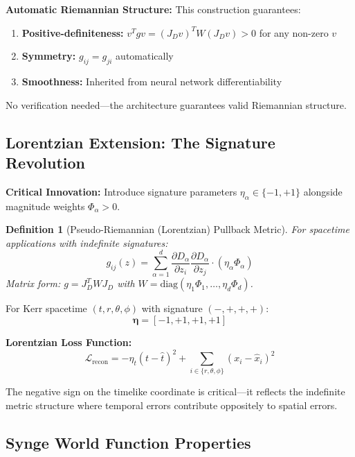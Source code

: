\documentclass[11pt,a4paper]{article}
\newtheorem{definition}{Definition}
\begin{document}
\textbf{Automatic Riemannian Structure:} This construction guarantees:
\begin{enumerate}
\item \textbf{Positive-definiteness:} $v^T g v = (J_D v)^T W (J_D v) > 0$ for any non-zero $v$
\item \textbf{Symmetry:} $g_{ij} = g_{ji}$ automatically
\item \textbf{Smoothness:} Inherited from neural network differentiability
\end{enumerate}

No verification needed—the architecture guarantees valid Riemannian structure.

\subsection{Lorentzian Extension: The Signature Revolution}

\textbf{Critical Innovation:} Introduce signature parameters $\eta_\alpha \in \{-1,+1\}$ alongside magnitude weights $\Phi_\alpha > 0$.

\begin{definition}[Pseudo-Riemannian (Lorentzian) Pullback Metric]
For spacetime applications with indefinite signatures:
\begin{equation}
g_{ij}(z) = \sum_{\alpha=1}^d \frac{\partial D_\alpha}{\partial z_i}\frac{\partial D_\alpha}{\partial z_j} \cdot (\eta_\alpha \Phi_\alpha)
\end{equation}
Matrix form: $g = J_D^T W J_D$ with $W = \text{diag}(\eta_1\Phi_1,\ldots,\eta_d\Phi_d)$.
\end{definition}

For Kerr spacetime $(t,r,\theta,\phi)$ with signature $(-,+,+,+)$:
\begin{equation}
\boldsymbol{\eta} = [-1, +1, +1, +1]
\end{equation}

\textbf{Lorentzian Loss Function:}
\begin{equation}
\mathcal{L}_{\text{recon}} = -\eta_t(t - \hat{t})^2 + \sum_{i \in \{r,\theta,\phi\}} (x_i - \hat{x}_i)^2
\end{equation}

The negative sign on the timelike coordinate is critical—it reflects the indefinite metric structure where temporal errors contribute oppositely to spatial errors.

\subsection{Synge World Function Properties}
\end{document}
